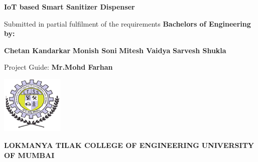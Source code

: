 


\begin{center}
	
	\LARGE \textbf  {IoT based Smart Sanitizer Dispenser}
	
\end{center}
\vspace{0.2cm}


\begin{center}
	
	 {Submitted in partial fulfilment of the requirements} 
	\vspace{0.2cm}
	\linebreak \textbf {Bachelors of Engineering by:}
	
\end{center}
\vspace{0.2cm}
\begin{center}
	
	\textbf{Chetan Kandarkar}
	\linebreak \textbf{Monish Soni}
	\linebreak \textbf{Mitesh Vaidya}
	\linebreak \textbf{Sarvesh Shukla}
	\vspace{1cm}
	
	Project Guide:
	\linebreak \textbf{Mr.Mohd Farhan}
\end{center} 
\begin{center}
	\includegraphics[width=30mm,scale=1]{11}
\end{center}

\begin{center}
	\vspace{0.5cm}
	
	\textbf{LOKMANYA TILAK COLLEGE OF ENGINEERING}
	\vspace{0.2cm}
	\vspace{0.2cm}
	\linebreak  \textbf {UNIVERSITY OF MUMBAI}
\end{center}
\vspace{0.2cm} 

